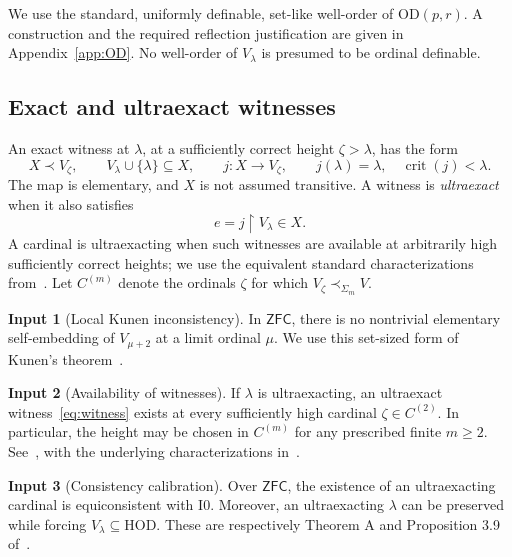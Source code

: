\documentclass[11pt,letterpaper]{article}
\theoremstyle{definition}
\newtheorem{inputthm}{Input}
\numberwithin{equation}{section}
\newcommand{\ZFC}{\mathsf{ZFC}}
\newcommand{\HOD}{\mathrm{HOD}}
\newcommand{\OD}{\mathrm{OD}}
\newcommand{\crit}{\operatorname{crit}}
\newcommand{\restr}{\mathbin{\upharpoonright}}
\newcommand{\Izero}{\mathrm{I0}}
\begin{document}
We use the standard, uniformly definable, set-like well-order of $\OD(p,r)$. A construction and the required reflection justification are given in Appendix~\ref{app:OD}. No well-order of $V_\lambda$ is presumed to be ordinal definable.

\subsection{Exact and ultraexact witnesses}

An exact witness at $\lambda$, at a sufficiently correct height $\zeta>\lambda$, has the form
\begin{equation}
X\prec V_\zeta,\qquad V_\lambda\cup\{\lambda\}\subseteq X,
\qquad j:X\longrightarrow V_\zeta,
\qquad j(\lambda)=\lambda,\quad\crit(j)<\lambda.
\label{eq:witness}
\end{equation}
The map is elementary, and $X$ is not assumed transitive. A witness is \emph{ultraexact} when it also satisfies
\begin{equation}
e=j\restr V_\lambda\in X.
\label{eq:ultra}
\end{equation}
A cardinal is ultraexacting when such witnesses are available at arbitrarily high sufficiently correct heights; we use the equivalent standard characterizations from~\cite{ABL,ABGL}. Let $C^{(m)}$ denote the ordinals $\zeta$ for which $V_\zeta\prec_{\Sigma_m}V$.

\begin{inputthm}[Local Kunen inconsistency]\label{in:kunen}
In $\ZFC$, there is no nontrivial elementary self-embedding of $V_{\mu+2}$ at a limit ordinal $\mu$. We use this set-sized form of Kunen's theorem~\cite{Kunen,HKP}.
\end{inputthm}

\begin{inputthm}[Availability of witnesses]\label{in:witness}
If $\lambda$ is ultraexacting, an ultraexact witness~\eqref{eq:witness} exists at every sufficiently high cardinal $\zeta\in C^{(2)}$. In particular, the height may be chosen in $C^{(m)}$ for any prescribed finite $m\ge2$. See~\cite[Lemma 2.2 and Proposition 2.4]{ABGL}, with the underlying characterizations in~\cite{ABL}.
\end{inputthm}

\begin{inputthm}[Consistency calibration]\label{in:cons}
Over $\ZFC$, the existence of an ultraexacting cardinal is equiconsistent with $\Izero$. Moreover, an ultraexacting $\lambda$ can be preserved while forcing $V_\lambda\subseteq\HOD$. These are respectively Theorem A and Proposition 3.9 of~\cite{ABGL}.
\end{inputthm}
\end{document}
